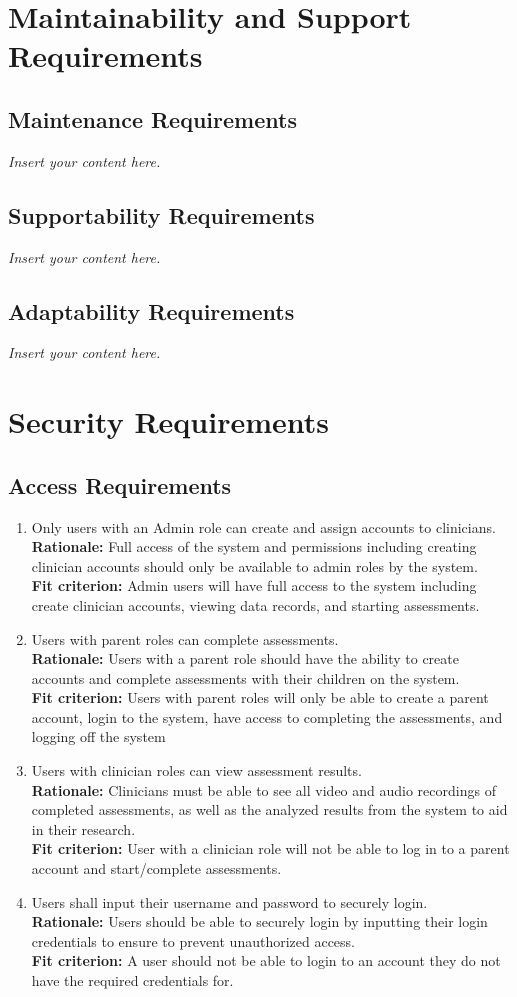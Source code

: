 \documentclass[12pt]{article}
\newcommand{\lips}{\textit{Insert your content here.}}
\begin{document}
\section{Maintainability and Support Requirements}
\subsection{Maintenance Requirements}
\lips
\subsection{Supportability Requirements}
\lips
\subsection{Adaptability Requirements}
\lips

\section{Security Requirements}
\subsection{Access Requirements}
\begin{enumerate}[{SR-AC}1. ]
  \item Only users with an Admin role can create and assign accounts to clinicians.\\
  \textbf{Rationale: }Full access of the system and permissions including creating clinician accounts should only be available to admin roles by the system. \\
  \textbf{Fit criterion: }Admin users will have full access to the system including create clinician accounts, viewing data records, and starting assessments. 
  \item Users with parent roles can complete assessments.\\
  \textbf{Rationale: }Users with a parent role should have the ability to create accounts and complete assessments with their children on the system.\\
  \textbf{Fit criterion: }Users with parent roles will only be able to create a parent account, login to the system, have access to completing the assessments, and logging off the system 
  \item Users with clinician roles can view assessment results.\\
  \textbf{Rationale: }Clinicians must be able to see all video and audio recordings of completed assessments, as well as the analyzed results from the system to aid in their research. \\
  \textbf{Fit criterion: }User with a clinician role will not be able to log in to a parent account and start/complete assessments. 
  \item Users shall input their username and password to securely login.\\
  \textbf{Rationale: }Users should be able to securely login by inputting their login credentials to ensure to prevent unauthorized access. \\
  \textbf{Fit criterion: }A user should not be able to login to an account they do not have the required credentials for.
\end{enumerate}
\end{document}
